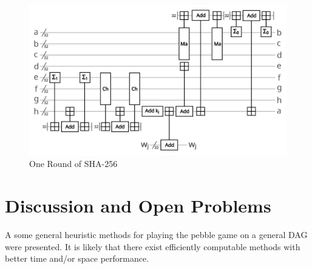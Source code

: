 \begin{figure}[ht]
      \capstart
      \centering
      \includegraphics[width=0.9\hsize]{images/sha_round}
      \caption{One Round of SHA-256}
      \label{fig:sha}
\end{figure}

\section{Discussion and Open Problems} 

A some general heuristic methods for playing the pebble game on a general DAG
were presented. It is likely that there exist efficiently computable methods
with better time and/or space performance. 


